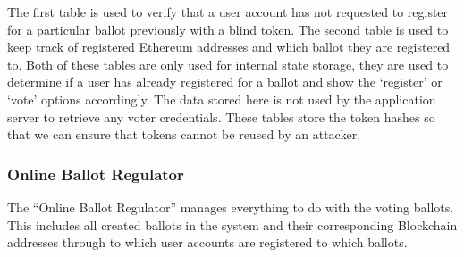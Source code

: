 \documentclass{article}
\begin{document}
The first table is used to verify that a user account has not requested to register for a particular ballot previously with a blind token. The second table is used to keep track of registered Ethereum addresses and which ballot they are registered to. Both of these tables are only used for internal state storage, they are used to determine if a user has already registered for a ballot and show the `register' or `vote' options accordingly. The data stored here is not used by the application server to retrieve any voter credentials. These tables store the token hashes so that we can ensure that tokens cannot be reused by an attacker.

\subsubsection{Online Ballot Regulator}
The ``Online Ballot Regulator'' manages everything to do with the voting ballots. This includes all created ballots in the system and their corresponding Blockchain addresses through to which user accounts are registered to which ballots.
\end{document}
